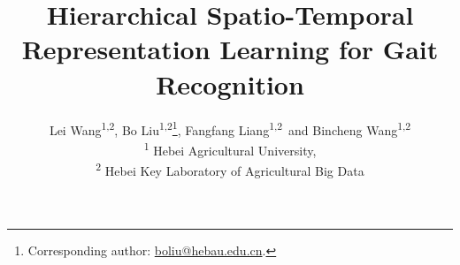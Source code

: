 \documentclass[10pt,twocolumn,letterpaper]{article}
\begin{document}
\title{Hierarchical Spatio-Temporal Representation Learning for Gait Recognition}

\author{Lei Wang\textsuperscript{1,2}, Bo Liu\textsuperscript{1,2}\thanks{Corresponding author: \href{mailto:boliu@hebau.edu.cn}{boliu@hebau.edu.cn}.}, Fangfang Liang\textsuperscript{1,2}~and Bincheng Wang\textsuperscript{1,2} \\
\textsuperscript{1} Hebei Agricultural University, \\ \textsuperscript{2} Hebei Key Laboratory of Agricultural Big Data
}

\maketitle
\ificcvfinal\thispagestyle{empty}\fi
\end{document}
